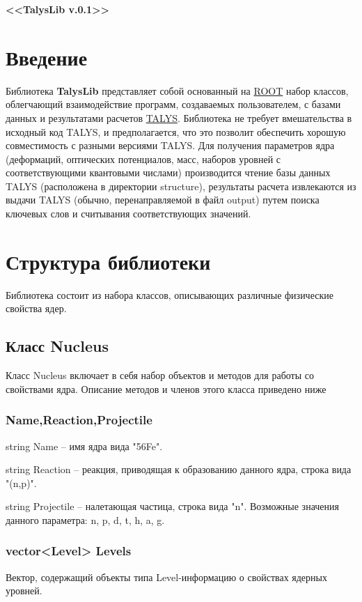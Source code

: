 \documentclass[a4paper,12pt]{extarticle}
\begin{document}
\begin{titlepage}
\pagestyle{empty} %
\begin{center}
\vspace{4cm}
\Large{\textbf{<<TalysLib v.0.1>>}}\\
\vspace{1.6cm}
\newpage
\end{center}
\tableofcontents%
\end{titlepage}
\section{Введение}
Библиотека \textbf{TalysLib} представляет собой основанный на \href{https://root.cern/}{ROOT} набор классов, облегчающий взаимодействие программ, создаваемых пользователем, с базами данных и результатами расчетов \href{https://tendl.web.psi.ch/tendl_2019/talys.html}{TALYS}. Библиотека не требует вмешательства в исходный код TALYS, и предполагается, что это позволит обеспечить хорошую совместимость с разными версиями TALYS. Для получения параметров ядра (деформаций, оптических потенциалов, масс, наборов уровней с соответствующими квантовыми числами) производится чтение базы данных TALYS (расположена в директории structure), результаты расчета извлекаются из выдачи TALYS (обычно, перенаправляемой в файл output) путем поиска ключевых слов и считывания соответствующих значений.
\section{Структура библиотеки}
Библиотека состоит из набора классов, описывающих различные физические свойства ядер. 
\subsection{Класс Nucleus}
Класс Nucleus включает в себя набор объектов и методов для работы со свойствами ядра. Описание методов и членов этого класса приведено ниже
\subsubsection{Name,Reaction,Projectile}
string Name -- имя ядра вида "56Fe".

string Reaction -- реакция, приводящая к образованию данного ядра, строка вида "(n,p)".

string Projectile -- налетающая частица, строка вида "n". Возможные значения данного параметра: n, p, d, t, h, a, g.
\subsubsection{vector<Level> Levels}
Вектор, содержащий объекты типа Level-информацию о свойствах ядерных уровней.
\end{document}
